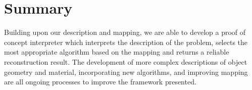 \section{Summary}
Building upon our description and mapping, we are able to develop a proof of concept interpreter which interprets the description of the problem, selects the most appropriate algorithm based on the mapping and returns a reliable reconstruction result. The development of more complex descriptions of object geometry and material, incorporating new algorithms, and improving mapping are all ongoing processes to improve the framework presented.
